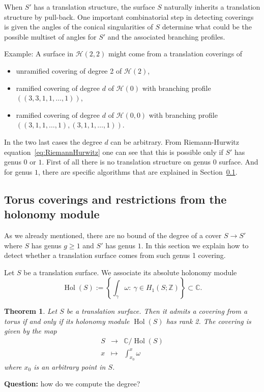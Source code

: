\documentclass[a4paper,12pt]{article}
\def\bC{\mathbb{C}}
\def\bZ{\mathbb{Z}}
\def\cH{\mathcal{H}}
\def\Hol{\operatorname{Hol}}
\newtheorem{theorem}[definition]{Theorem}
\begin{document}
When $S'$ has a translation structure,
the surface $S$ naturally inherits a translation structure by pull-back. One important
combinatorial step in detecting coverings is given the angles of the conical singularities
of $S$ determine what could be the possible multiset of angles for $S'$ and the
associated branching profiles.

Example:
A surface in $\cH(2,2)$ might come from a translation coverings of
\begin{itemize}
\item unramified covering of degree 2 of $\mathcal{H}(2)$,
\item ramified covering of degree $d$ of $\mathcal{H}(0)$ with branching profile
$((3,3,1,1,\ldots,1))$,
\item ramified covering of degree $d$ of $\mathcal{H}(0,0)$ with branching profile
$((3,1,1,\ldots,1), (3,1,1,\ldots,1))$.
\end{itemize}
In the two last cases the degree $d$ can be arbitrary. From Riemann-Hurwitz equation~\eqref{eq:RiemannHurwitz} one can see that this is possible only if $S'$ has genus $0$ or $1$. First of all there is no translation structure on genus 0 surface. And for genus $1$, there are specific algorithms that are explained in Section~\ref{ssec:TorusCoverings}.

\subsection{Torus coverings and restrictions from the holonomy module}
\label{ssec:TorusCoverings}
As we already mentioned, there are no bound of the degree of a cover $S \to S'$
where $S$ has genus $g \geq 1$ and $S'$ has genus $1$. In this section we explain
how to detect whether a translation surface comes from such genus 1 covering.

Let $S$ be a translation surface. We associate its absolute holonomy module
\[
\Hol(S) := \left\{\int_\gamma \omega:\ \gamma \in H_1(S; \bZ)\right\} \subset \bC.
\]
\begin{theorem}
Let $S$ be a translation surface. Then it admits a covering from a torus
if and only if its holonomy module $\Hol(S)$ has rank 2. The covering
is given by the map
\[
\begin{array}{lll}
S & \to & \bC / \Hol(S) \\
x & \mapsto & \int_{x_0}^x \omega
\end{array}
\]
where $x_0$ is an arbitrary point in $S$.
\end{theorem}
\textbf{Question:} how do we compute the degree?
\end{document}

